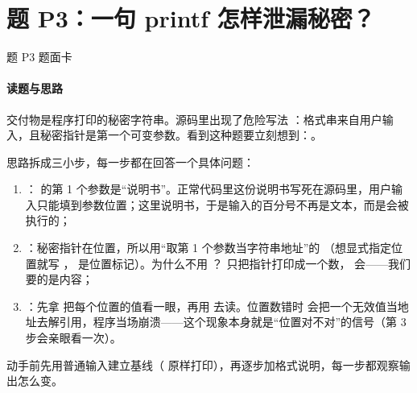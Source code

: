 \documentclass[UTF8,12pt,oneside]{ctexbook}
\begin{document}
\section{题 P3：一句 printf 怎样泄漏秘密？}

\begin{challenge}{题 P3 题面卡}
\end{challenge}

\paragraph{读题与思路}交付物是程序打印的秘密字符串。源码里出现了危险写法 ：格式串来自用户输入，且秘密指针是第一个可变参数。看到这种题要立刻想到：。

思路拆成三小步，每一步都在回答一个具体问题：
\begin{enumerate}[label=\arabic*.]
\item {}： 的第 1 个参数是“说明书”。正常代码里这份说明书写死在源码里，用户输入只能填到参数位置；这里说明书，于是输入的百分号不再是文本，而是会被执行的；
\item {}：秘密指针在位置，所以用“取第 1 个参数当字符串地址”的 （想显式指定位置就写 ， 是位置标记）。为什么不用 ？ 只把指针打印成一个数， 会——我们要的是内容；
\item {}：先拿  把每个位置的值看一眼，再用  去读。位置数错时  会把一个无效值当地址去解引用，程序当场崩溃——这个现象本身就是“位置对不对”的信号（第 3 步会亲眼看一次）。
\end{enumerate}
动手前先用普通输入建立基线（ 原样打印），再逐步加格式说明，每一步都观察输出怎么变。
\end{document}
